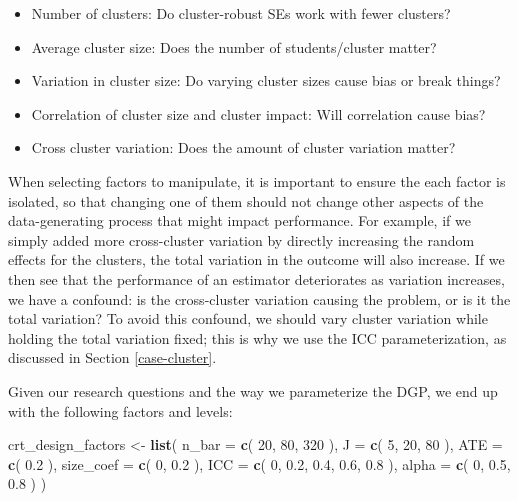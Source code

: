 \documentclass[
]{book}
\newenvironment{Shaded}{\begin{snugshade}}{\end{snugshade}}
\newcommand{\AttributeTok}[1]{\textcolor[rgb]{0.13,0.29,0.53}{#1}}
\newcommand{\DecValTok}[1]{\textcolor[rgb]{0.00,0.00,0.81}{#1}}
\newcommand{\FloatTok}[1]{\textcolor[rgb]{0.00,0.00,0.81}{#1}}
\newcommand{\FunctionTok}[1]{\textcolor[rgb]{0.13,0.29,0.53}{\textbf{#1}}}
\newcommand{\NormalTok}[1]{#1}
\newcommand{\OtherTok}[1]{\textcolor[rgb]{0.56,0.35,0.01}{#1}}
\providecommand{\tightlist}{%
  \setlength{\itemsep}{0pt}\setlength{\parskip}{0pt}}
\begin{document}
\begin{itemize}
\tightlist
\item
  Number of clusters: Do cluster-robust SEs work with fewer clusters?
\item
  Average cluster size: Does the number of students/cluster matter?
\item
  Variation in cluster size: Do varying cluster sizes cause bias or break things?
\item
  Correlation of cluster size and cluster impact: Will correlation cause bias?
\item
  Cross cluster variation: Does the amount of cluster variation matter?
\end{itemize}

When selecting factors to manipulate, it is important to ensure the each factor is isolated, so that changing one of them should not change other aspects of the data-generating process that might impact performance.
For example, if we simply added more cross-cluster variation by directly increasing the random effects for the clusters, the total variation in the outcome will also increase.
If we then see that the performance of an estimator deteriorates as variation increases, we have a confound: is the cross-cluster variation causing the problem, or is it the total variation?
To avoid this confound, we should vary cluster variation while holding the total variation fixed; this is why we use the ICC parameterization, as discussed in Section \ref{case-cluster}.

Given our research questions and the way we parameterize the DGP, we end up with the following factors and levels:

\begin{Shaded}
\begin{Highlighting}[]
\NormalTok{crt\_design\_factors }\OtherTok{\textless{}{-}} \FunctionTok{list}\NormalTok{(}
  \AttributeTok{n\_bar =} \FunctionTok{c}\NormalTok{( }\DecValTok{20}\NormalTok{, }\DecValTok{80}\NormalTok{, }\DecValTok{320}\NormalTok{ ),}
  \AttributeTok{J =} \FunctionTok{c}\NormalTok{( }\DecValTok{5}\NormalTok{, }\DecValTok{20}\NormalTok{, }\DecValTok{80}\NormalTok{ ),}
  \AttributeTok{ATE =} \FunctionTok{c}\NormalTok{( }\FloatTok{0.2}\NormalTok{ ),}
  \AttributeTok{size\_coef =} \FunctionTok{c}\NormalTok{( }\DecValTok{0}\NormalTok{, }\FloatTok{0.2}\NormalTok{ ),}
  \AttributeTok{ICC =} \FunctionTok{c}\NormalTok{( }\DecValTok{0}\NormalTok{, }\FloatTok{0.2}\NormalTok{, }\FloatTok{0.4}\NormalTok{, }\FloatTok{0.6}\NormalTok{, }\FloatTok{0.8}\NormalTok{ ),}
  \AttributeTok{alpha =} \FunctionTok{c}\NormalTok{( }\DecValTok{0}\NormalTok{, }\FloatTok{0.5}\NormalTok{, }\FloatTok{0.8}\NormalTok{ )}
\NormalTok{)}
\end{Highlighting}
\end{Shaded}
\end{document}
